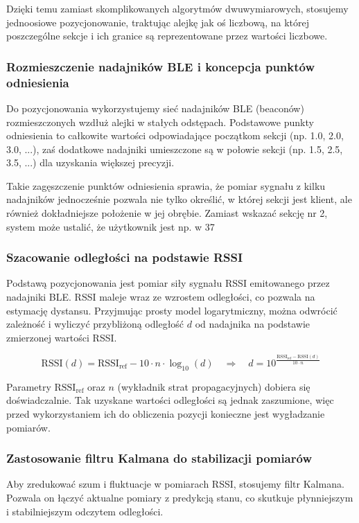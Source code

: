 Dzięki temu zamiast skomplikowanych algorytmów dwuwymiarowych, stosujemy jednoosiowe pozycjonowanie, traktując alejkę jak oś liczbową, na której poszczególne sekcje i ich granice są reprezentowane przez wartości liczbowe.
\subsubsection{Rozmieszczenie nadajników BLE i koncepcja punktów odniesienia}
Do pozycjonowania wykorzystujemy sieć nadajników BLE (beaconów) rozmieszczonych wzdłuż alejki w stałych odstępach. Podstawowe punkty odniesienia to całkowite wartości odpowiadające początkom sekcji (np. 1.0, 2.0, 3.0, ...), zaś dodatkowe nadajniki umieszczone są w połowie sekcji (np. 1.5, 2.5, 3.5, ...) dla uzyskania większej precyzji.

Takie zagęszczenie punktów odniesienia sprawia, że pomiar sygnału z kilku nadajników jednocześnie pozwala nie tylko określić, w której sekcji jest klient, ale również dokładniejsze położenie w jej obrębie. Zamiast wskazać sekcję nr 2, system może ustalić, że użytkownik jest np. w 37%
\subsubsection{Szacowanie odległości na podstawie RSSI}
Podstawą pozycjonowania jest pomiar siły sygnału RSSI emitowanego przez nadajniki BLE. RSSI maleje wraz ze wzrostem odległości, co pozwala na estymację dystansu. Przyjmując prosty model logarytmiczny, można odwrócić zależność i wyliczyć przybliżoną odległość \( d \) od nadajnika na podstawie zmierzonej wartości RSSI.

\[
\text{RSSI}(d) = \text{RSSI}_{\text{ref}} - 10 \cdot n \cdot \log_{10}(d) \quad \Rightarrow \quad d = 10^{\frac{\text{RSSI}_{\text{ref}} - \text{RSSI}(d)}{10 \cdot n}}
\]

Parametry \(\text{RSSI}_{\text{ref}}\) oraz \( n \) (wykładnik strat propagacyjnych) dobiera się doświadczalnie. Tak uzyskane wartości odległości są jednak zaszumione, więc przed wykorzystaniem ich do obliczenia pozycji konieczne jest wygładzanie pomiarów.

\subsubsection{Zastosowanie filtru Kalmana do stabilizacji pomiarów}
Aby zredukować szum i fluktuacje w pomiarach RSSI, stosujemy filtr Kalmana. Pozwala on łączyć aktualne pomiary z predykcją stanu, co skutkuje płynniejszym i stabilniejszym odczytem odległości.


